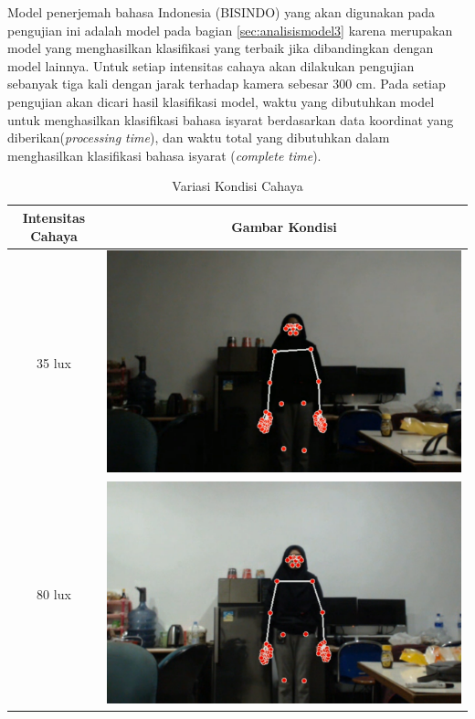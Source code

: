 Model penerjemah bahasa Indonesia (BISINDO) yang akan digunakan pada pengujian ini adalah model pada bagian \ref{sec:analisismodel3} karena merupakan model yang menghasilkan klasifikasi yang terbaik jika dibandingkan dengan model lainnya. Untuk setiap intensitas cahaya akan dilakukan pengujian sebanyak tiga kali dengan jarak terhadap kamera sebesar 300 cm. Pada setiap pengujian akan dicari hasil klasifikasi model, waktu yang dibutuhkan model untuk menghasilkan klasifikasi bahasa isyarat berdasarkan data koordinat yang diberikan(\emph{processing time}), dan waktu total yang dibutuhkan dalam menghasilkan klasifikasi bahasa isyarat (\emph{complete time}).  

\newpage
\begin{longtable}{|c|c|}
  \caption{Variasi Kondisi Cahaya}
  \label{tb:kondisicahaya}                                   \\
  \hline
  \rowcolor[HTML]{C0C0C0}
  \textbf{Intensitas Cahaya} & \textbf{Gambar Kondisi}  \\
  \hline
  35 lux            &  \includegraphics[scale=0.3]{gambar/bab4-gelap.png}                \\
  \hline
  80 lux            & \includegraphics[scale=0.3]{gambar/bab4-remang.png}                 \\

\end{longtable}
